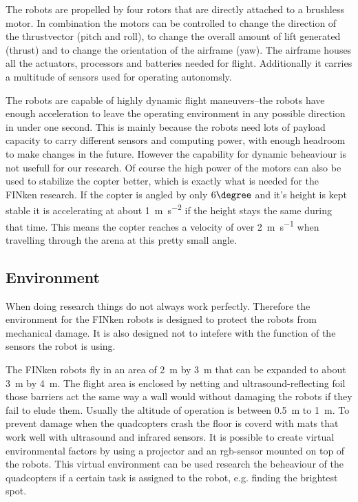 The robots are propelled by four rotors that are directly attached to a brushless motor.
In combination the motors can be controlled to change the direction of the thrustvector (pitch and roll), to change the overall amount of lift generated (thrust) and to change the orientation of the airframe (yaw).
The airframe houses all the actuators, processors and batteries needed for flight.
Additionally it carries a multitude of sensors used for operating autonomsly.


The robots are capable of highly dynamic flight maneuvers–the robots have enough acceleration to leave the operating environment in any possible direction in under one second.
This is mainly because the robots need lots of payload capacity to carry different sensors and computing power, with enough headroom to make changes in the future.
However the capability for dynamic beheaviour is not usefull for our research.
Of course the high power of the motors can also be used to stabilize the copter better, which is exactly what is needed for the FINken research.
If the copter is angled by only $6\degree$ and it's height is kept stable it is accelerating at about \SI{1}{\metre\per\square\second} if the height stays the same during that time.
This means the copter reaches a velocity of over \SI{2}{\metre\per\second} when travelling through the arena at this pretty small angle. 

\subsection{Environment}
When doing research things do not always work perfectly.
Therefore the environment for the FINken robots is designed to protect the robots from mechanical damage.
It is also designed not to intefere with the function of the sensors the robot is using. 

The FINken robots fly in an area of \SI{2}{\metre} by \SI{3}{\metre} that can be expanded to about \SI{3}{\metre} by \SI{4}{\metre}.
The flight area is enclosed by netting and ultrasound-reflecting foil those barriers act the same way a wall would without damaging the robots if they fail to elude them.
Usually the altitude of operation is between \SI{0.5}{\metre} to \SI{1}{\metre}.
To prevent damage when the quadcopters crash the floor is coverd with mats that work well with ultrasound and infrared sensors.
It is possible to create virtual environmental factors by using a projector and an rgb-sensor mounted on top of the robots.
This virtual environment can be used research the beheaviour of the quadcopters if a certain task is assigned to the robot, e.g. finding the brightest spot.


